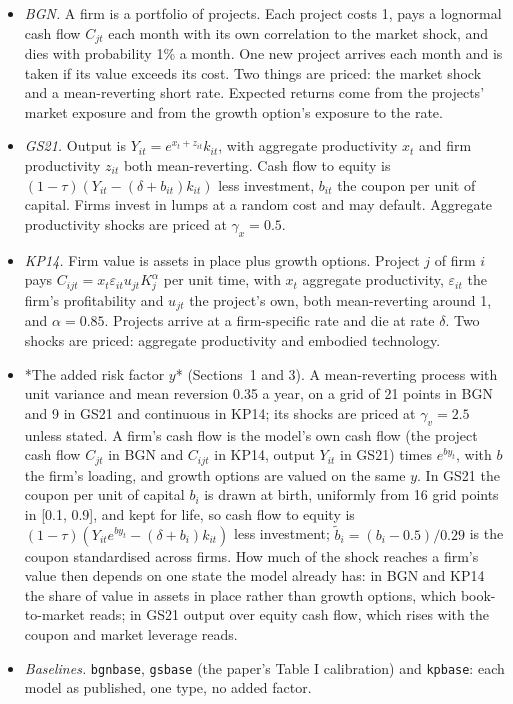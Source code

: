 \documentclass[11pt]{article}
\begin{document}
\begin{itemize}
\item \emph{BGN.} A firm is a portfolio of projects. Each project costs 1, pays a lognormal cash flow $C_{jt}$ each month with its own correlation to the market shock, and dies with probability 1\% a month. One new project arrives each month and is taken if its value exceeds its cost. Two things are priced: the market shock and a mean-reverting short rate. Expected returns come from the projects' market exposure and from the growth option's exposure to the rate.
\item \emph{GS21.} Output is $Y_{it} = e^{x_t + z_{it}} k_{it}$, with aggregate productivity $x_t$ and firm productivity $z_{it}$ both mean-reverting. Cash flow to equity is $(1-\tau)(Y_{it} - (\delta + b_{it}) k_{it})$ less investment, $b_{it}$ the coupon per unit of capital. Firms invest in lumps at a random cost and may default. Aggregate productivity shocks are priced at $\gamma_x = 0.5$.
\item \emph{KP14.} Firm value is assets in place plus growth options. Project $j$ of firm $i$ pays $C_{ijt} = x_t \varepsilon_{it} u_{jt} K_j^{\alpha}$ per unit time, with $x_t$ aggregate productivity, $\varepsilon_{it}$ the firm's profitability and $u_{jt}$ the project's own, both mean-reverting around 1, and $\alpha = 0.85$. Projects arrive at a firm-specific rate and die at rate $\delta$. Two shocks are priced: aggregate productivity and embodied technology.
\item *The added risk factor $y$* (Sections~1 and 3). A mean-reverting process with unit variance and mean reversion 0.35 a year, on a grid of 21 points in BGN and 9 in GS21 and continuous in KP14; its shocks are priced at $\gamma_v = 2.5$ unless stated. A firm's cash flow is the model's own cash flow (the project cash flow $C_{jt}$ in BGN and $C_{ijt}$ in KP14, output $Y_{it}$ in GS21) times $e^{b y_t}$, with $b$ the firm's loading, and growth options are valued on the same $y$. In GS21 the coupon per unit of capital $b_i$ is drawn at birth, uniformly from 16 grid points in [0.1, 0.9], and kept for life, so cash flow to equity is $(1-\tau)(Y_{it} e^{b y_t} - (\delta + b_i) k_{it})$ less investment; $\tilde b_i = (b_i - 0.5)/0.29$ is the coupon standardised across firms. How much of the shock reaches a firm's value then depends on one state the model already has: in BGN and KP14 the share of value in assets in place rather than growth options, which book-to-market reads; in GS21 output over equity cash flow, which rises with the coupon and market leverage reads.
\item \emph{Baselines.} \texttt{bgnbase}, \texttt{gsbase} (the paper's Table I calibration) and \texttt{kpbase}: each model as published, one type, no added factor.
\end{itemize}
\end{document}
